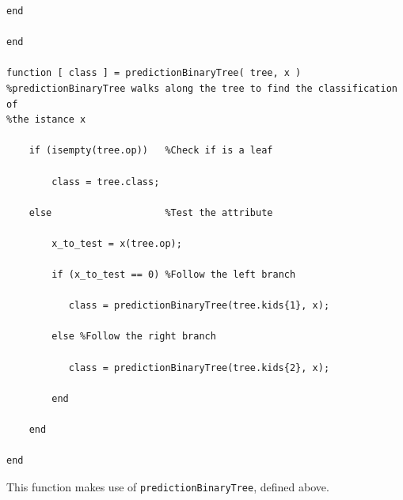 \documentclass{article}
\begin{document}
\begin{lstlisting}[firstnumber=28]
end

end

function [ class ] = predictionBinaryTree( tree, x )
%predictionBinaryTree walks along the tree to find the classification of
%the istance x
    
    if (isempty(tree.op))   %Check if is a leaf
        
        class = tree.class;
        
    else                    %Test the attribute
        
        x_to_test = x(tree.op);
        
        if (x_to_test == 0) %Follow the left branch
           
           class = predictionBinaryTree(tree.kids{1}, x);
            
        else %Follow the right branch
            
           class = predictionBinaryTree(tree.kids{2}, x);
            
        end
        
    end

end
\end{lstlisting}

This function makes use of \verb$predictionBinaryTree$, defined above. 
\end{document}
